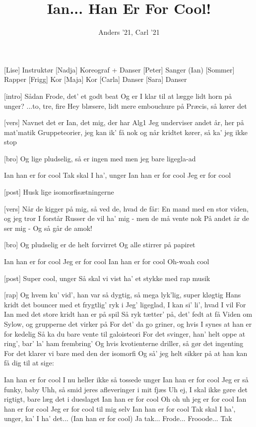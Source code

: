 \documentclass[a4paper,11pt]{article}
\title{Ian... Han Er For Cool!}
\author{Anders '21, Carl '21}
\begin{document}
\maketitle

\begin{roles}
[Lise] Instruktør
[Nadja] Koreograf + Danser
[Peter] Sanger (Ian)
[Sommer] Rapper
[Frigg] Kor
[Maja] Kor
[Carla] Danser
[Sara] Danser
\end{roles}



\begin{song}
[intro] Sådan Frode, det' et godt beat
Og er I klar til at lægge lidt horn på unger?
...to, tre, fire
Hey blæsere, lidt mere embouchure på
Præcis, så kører det

[vers] Navnet det er Ian, det mig, der har Alg1
Jeg underviser andet år, her på mat'matik
Gruppeteorier, jeg kan ik' få nok
og når kridtet kører, så ka' jeg ikke stop

[bro] Og lige pludselig, så er ingen med
men jeg bare ligegla-ad

 Ian han er for cool
Tak skal I ha', unger
Ian han er for cool
Jeg er for cool

[post] Husk lige isomorfisætningerne

[vers] Når de kigger på mig, så ved de, hvad de får:
En mand med en stor viden, og jeg tror I forstår
Russer de vil ha' mig - men de må vente nok
På andet år de ser mig - Og så går de amok!

[bro] Og pludselig er de helt forvirret
Og alle stirrer på papiret

 Ian han er for cool
Jeg er for cool
Ian han er for cool
Oh-woah cool

[post] Super cool, unger
Så skal vi vist ha' et stykke med rap musik

[rap] Og hvem ku' vid', han var så dygtig,
så mega lyk'lig, super kløgtig
Hans kridt det bouncer med et frygtlig' ryk i
Jeg' ligeglad, I kan si' li', hvad I vil
For Ian med det store kridt han er på spil
Så ryk tætter' på, det' fedt at få
Viden om Sylow, og grupperne det virker på
For det' da go griner, og hvis I synes at han er for kedelig
Så ka du bare vente til galoisteori
For det svinger, han' helt oppe at ring', bar' la' ham frembring'
Og hvis kvotienterne driller, så gør det ingenting
For det klarer vi bare med den der isomorfi
Og så' jeg helt sikker på at han kan få dig til at sige:

 Ian han er for cool
I nu heller ikke så tossede unger
Ian han er for cool
Jeg er så funky, baby
Uhh, så smid jeres afleveringer i mit fjæs
Uh ej, I skal ikke gøre det rigtigt, bare læg det i dueslaget
Ian han er for cool
Oh oh uh jeg er for cool
Ian han er for cool
Jeg er for cool til mig selv
Ian han er for cool
Tak skal I ha', unger, ka' I ha' det... (Ian han er for cool)
Ja tak... Frode...
Frooode... Tak
\end{song}
\end{document}
